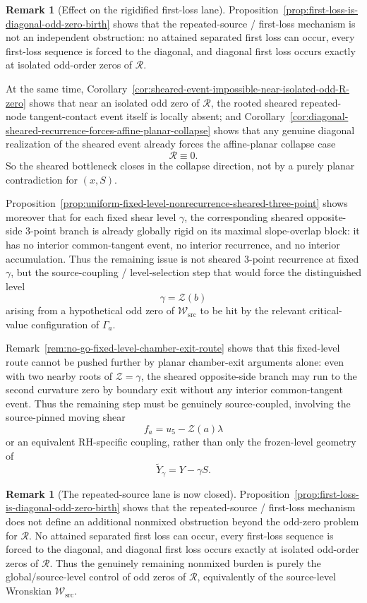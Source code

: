 \documentclass[11pt,a4paper]{amsart}
\theoremstyle{plain}
\theoremstyle{definition}
\newtheorem{remark}[theorem]{Remark}
\begin{document}
\begin{remark}[Effect on the rigidified first-loss lane]
\label{rem:effect-of-shear-transfer-on-first-loss}
Proposition~\ref{prop:first-loss-is-diagonal-odd-zero-birth} shows that the
repeated-source / first-loss mechanism is not an independent obstruction:
no attained separated first loss can occur, every first-loss sequence is forced
to the diagonal, and diagonal first loss occurs exactly at isolated odd-order
zeros of $\mathcal R$.

At the same time,
Corollary~\ref{cor:sheared-event-impossible-near-isolated-odd-R-zero} shows
that near an isolated odd zero of $\mathcal R$, the rooted sheared
repeated-node tangent-contact event itself is locally absent; and
Corollary~\ref{cor:diagonal-sheared-recurrence-forces-affine-planar-collapse}
shows that any genuine diagonal realization of the sheared event already forces
the affine-planar collapse case
\[
\mathcal R\equiv 0.
\]
So the sheared bottleneck closes in the collapse direction, not by a purely
planar contradiction for $(x,S)$.

Proposition~\ref{prop:uniform-fixed-level-nonrecurrence-sheared-three-point}
shows moreover that for each fixed shear level $\gamma$, the corresponding
sheared opposite-side $3$-point branch is already globally rigid on its maximal
slope-overlap block: it has no interior common-tangent event, no interior
recurrence, and no interior accumulation. Thus the remaining issue is not
sheared $3$-point recurrence at fixed $\gamma$, but the source-coupling /
level-selection step that would force the distinguished level
\[
\gamma=\mathcal Z(b)
\]
arising from a hypothetical odd zero of $\mathcal W_{\mathrm{src}}$ to be hit
by the relevant critical-value configuration of $\Gamma_a$.

Remark~\ref{rem:no-go-fixed-level-chamber-exit-route} shows that this
fixed-level route cannot be pushed further by planar chamber-exit arguments
alone: even with two nearby roots of $\mathcal Z=\gamma$, the sheared
opposite-side branch may run to the second curvature zero by boundary exit
without any interior common-tangent event. Thus the remaining step must be
genuinely source-coupled, involving the source-pinned moving shear
\[
f_a=u_5-\mathcal Z(a)\lambda
\]
or an equivalent RH-specific coupling, rather than only the frozen-level
geometry of
\[
\widetilde Y_\gamma=Y-\gamma S.
\]
\end{remark}

\begin{remark}[The repeated-source lane is now closed]
\label{rem:repeated-source-lane-closed}
Proposition~\ref{prop:first-loss-is-diagonal-odd-zero-birth} shows that the
repeated-source / first-loss mechanism does not define an additional nonmixed
obstruction beyond the odd-zero problem for $\mathcal R$. No attained
separated first loss can occur, every first-loss sequence is forced to the
diagonal, and diagonal first loss occurs exactly at isolated odd-order zeros of
$\mathcal R$. Thus the genuinely remaining nonmixed burden is purely the
global/source-level control of odd zeros of $\mathcal R$, equivalently of the
source-level Wronskian $\mathcal W_{\mathrm{src}}$.
\end{remark}
\end{document}
